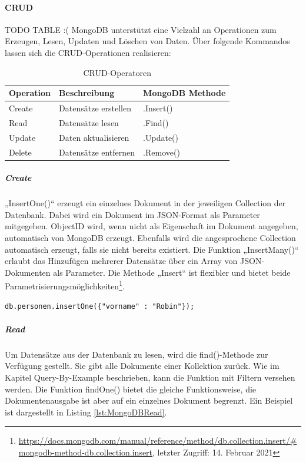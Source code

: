 \paragraph{CRUD} TODO TABLE :(
MongoDB unterstützt eine Vielzahl an Operationen zum Erzeugen, Lesen, Updaten und Löschen von Daten.
Über folgende Kommandos lassen sich die CRUD-Operationen realisieren:
\newline

\begin{table}[tbt]
\caption{CRUD-Operatoren}
\begin{center}
    \begin{tabular}{ l  p{8cm}  l }
    \toprule
    \textbf{Operation} & \textbf{Beschreibung} & \textbf{MongoDB Methode} \\
    \midrule

    Create & Datensätze erstellen & .Insert() \\

	Read & Datensätze lesen & .Find() \\

    Update & Daten aktualisieren & .Update() \\ 

    Delete & Datensätze entfernen & .Remove()  \\ 
    \bottomrule
    \end{tabular}
\end{center}
\end{table}

\noindent
\subparagraph{Create}
„InsertOne()“ erzeugt ein einzelnes Dokument in der jeweiligen Collection der Datenbank. Dabei wird ein Dokument im JSON-Format als Parameter mitgegeben. ObjectID wird, wenn nicht als Eigenschaft im Dokument angegeben, automatisch von MongoDB erzeugt. Ebenfalls wird die angesprochene Collection automatisch erzeugt, falls sie nicht bereits existiert. Die Funktion „InsertMany()“  erlaubt das Hinzufügen mehrerer Datensätze über ein Array von JSON-Dokumenten als Parameter. Die Methode „Insert“ ist flexibler und bietet beide Parametrisierungsmöglichkeiten\footnote{\url{https://docs.mongodb.com/manual/reference/method/db.collection.insert/\#mongodb-method-db.collection.insert}, letzter Zugriff: 14. Februar 2021}.
\newline
\begin{lstlisting}[caption=MongoDB Create, label=lst:MongoDBCreate]
db.personen.insertOne({"vorname" : "Robin"});
\end{lstlisting}

\noindent
\subparagraph{Read}
Um Datensätze aus der Datenbank zu lesen, wird die find()-Methode zur Verfügung gestellt. Sie gibt alle Dokumente einer Kollektion zurück. Wie im Kapitel Query-By-Example beschrieben, kann die Funktion mit Filtern versehen werden. Die Funktion findOne() bietet die gleiche Funktionsweise, die Dokumentenausgabe ist aber auf ein einzelnes Dokument begrenzt. 
Ein Beispiel ist dargestellt in Listing \ref{lst:MongoDBRead}.
\newline\newline

